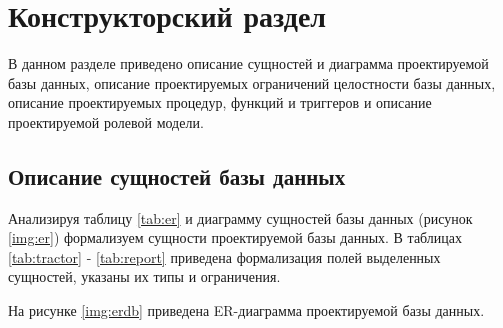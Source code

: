 \chapter{Конструкторский раздел}

В данном разделе приведено описание сущностей и диаграмма проектируемой базы данных, описание проектируемых ограничений целостности базы данных, описание проектируемых процедур, функций и триггеров и описание проектируемой ролевой модели.

\section{Описание сущностей базы данных}

Анализируя таблицу \ref{tab:er} и диаграмму сущностей базы данных (рисунок \ref{img:er}) формализуем сущности проектируемой базы данных. В таблицах \ref{tab:tractor} - \ref{tab:report} приведена формализация полей выделенных сущностей, указаны их типы и ограничения.



На рисунке \ref{img:erdb} приведена ER-диаграмма проектируемой базы данных.


